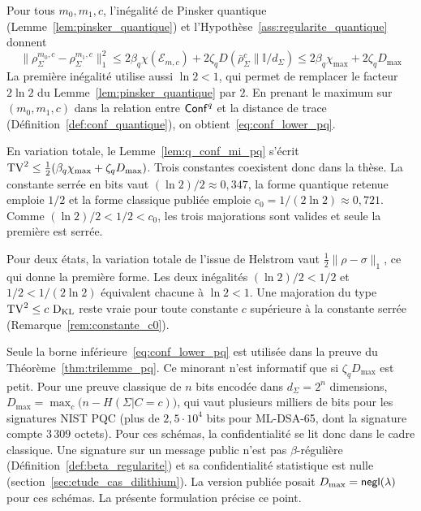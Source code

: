 \begin{sloppypar}
\begin{Preuve}
Pour tous $m_0, m_1, c$, l'in\'egalit\'e de Pinsker quantique
(Lemme~\ref{lem:pinsker_quantique}) et
l'Hypoth\`ese~\ref{ass:regularite_quantique} donnent
\begin{equation}
\|\rho_\Sigma^{m_0,c} - \rho_\Sigma^{m_1,c}\|_1^2 \leq 2\beta_q \chi(\mathcal{E}_{m,c}) + 2\zeta_q D(\bar{\rho}_\Sigma^c \| \mathbb{I}/d_\Sigma) \leq 2\beta_q \chi_{\max} + 2\zeta_q D_{\max}
\end{equation}
La premi\`ere in\'egalit\'e utilise aussi $\ln 2 < 1$, qui permet de remplacer le
facteur $2\ln 2$ du Lemme~\ref{lem:pinsker_quantique} par $2$. En prenant le maximum
sur $(m_0, m_1, c)$ dans la relation entre
$\mathsf{Conf}^q$ et la distance de trace
(D\'efinition~\ref{def:conf_quantique}), on obtient~\eqref{eq:conf_lower_pq}.
\end{Preuve}

\begin{remark}
\label{rem:raccord_pinsker}
En variation totale, le Lemme~\ref{lem:q_conf_mi_pq} s'\'ecrit
$\operatorname{TV}^2 \leq \tfrac12(\beta_q\chi_{\max} + \zeta_q D_{\max})$. Trois constantes
coexistent donc dans la th\`ese. La constante serr\'ee en bits vaut
$(\ln 2)/2 \approx 0{,}347$, la forme quantique retenue emploie $1/2$ et la forme
classique publi\'ee emploie $c_0 = 1/(2\ln 2) \approx 0{,}721$. Comme
$(\ln 2)/2 < 1/2 < c_0$, les trois majorations sont valides et seule la premi\`ere est
serr\'ee.
\end{remark}

\begin{Preuve}
Pour deux \'etats, la variation totale de l'issue de Helstrom vaut
$\tfrac12\|\rho - \sigma\|_1$, ce qui donne la premi\`ere forme. Les deux
in\'egalit\'es $(\ln 2)/2 < 1/2$ et $1/2 < 1/(2\ln 2)$ \'equivalent chacune \`a
$\ln 2 < 1$. Une majoration du type $\operatorname{TV}^2 \leq c\,\operatorname{D_{\text{KL}}}$ reste vraie pour toute
constante $c$ sup\'erieure \`a la constante serr\'ee
(Remarque~\ref{rem:constante_c0}).
\end{Preuve}

\begin{remark}
\label{rem:interp_lemme7}
Seule la borne inf\'erieure~\eqref{eq:conf_lower_pq} est utilis\'ee dans
la preuve du Th\'eor\`eme~\ref{thm:trilemme_pq}. Ce minorant n'est
informatif que si $\zeta_q D_{\max}$ est petit. Pour une preuve classique de
$n$ bits encod\'ee dans $d_\Sigma = 2^n$ dimensions,
$D_{\max} = \max_c\bigl(n - H(\Sigma|C=c)\bigr)$, qui vaut plusieurs milliers de bits pour les
signatures NIST PQC (plus de $2{,}5\cdot10^4$ bits pour ML-DSA-65, dont la
signature compte $3\,309$ octets). Pour ces sch\'emas, la confidentialit\'e se lit donc dans le
cadre classique. Une signature sur un message public n'est pas $\beta$-r\'eguli\`ere
(D\'efinition~\ref{def:beta_regularite}) et sa confidentialit\'e statistique est nulle
(section~\ref{sec:etude_cas_dilithium}). La version publi\'ee
posait $D_{\max} = \mathsf{negl}(\lambda)$ pour ces sch\'emas. La pr\'esente formulation
pr\'ecise ce point.
\end{remark}


\end{sloppypar}
